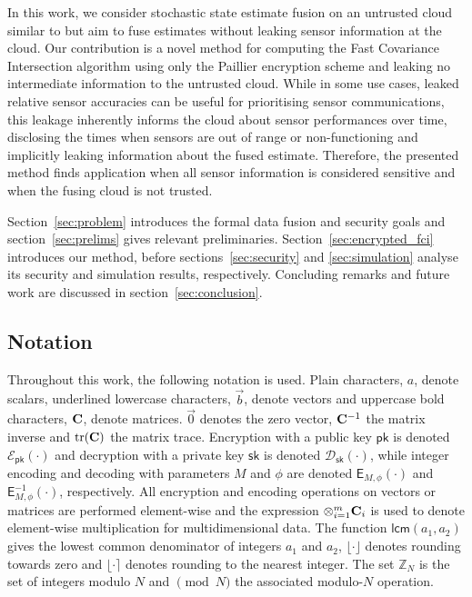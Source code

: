\documentclass[letterpaper, 10 pt, conference]{ieeeconf}
\begin{document}
In this work, we consider stochastic state estimate fusion on an untrusted cloud similar to \cite{risticSecureFastCovariance2021} but aim to fuse estimates without leaking sensor information at the cloud. Our contribution is a novel method for computing the Fast Covariance Intersection algorithm using only the Paillier encryption scheme and leaking no intermediate information to the untrusted cloud. While in some use cases, leaked relative sensor accuracies can be useful for prioritising sensor communications, this leakage inherently informs the cloud about sensor performances over time, disclosing the times when sensors are out of range or non-functioning and implicitly leaking information about the fused estimate. Therefore, the presented method finds application when all sensor information is considered sensitive and when the fusing cloud is not trusted.

Section~\ref{sec:problem} introduces the formal data fusion and security goals and section~\ref{sec:prelims} gives relevant preliminaries. Section~\ref{sec:encrypted_fci} introduces our method, before sections~\ref{sec:security} and \ref{sec:simulation} analyse its security and simulation results, respectively. Concluding remarks and future work are discussed in section~\ref{sec:conclusion}.

\subsection{Notation}
Throughout this work, the following notation is used. Plain characters, $a$, denote scalars, underlined lowercase characters, $\vec{b}$, denote vectors and uppercase bold characters, ${{\mathbf{C}}}$, denote matrices. $\vec{0}$ denotes the zero vector, ${{\mathbf{C}}}^{-1}$ the matrix inverse and $\operatorname{tr}({{\mathbf{C}}})$ the matrix trace. Encryption with a public key $\mathsf{pk}$ is denoted $\mathcal{E}_{\mathsf{pk}}(\cdot)$ and decryption with a private key $\mathsf{sk}$ is denoted $\mathcal{D}_{\mathsf{sk}}(\cdot)$, while integer encoding and decoding with parameters $M$ and $\phi$ are denoted $\mathsf{E}_{M,\phi}(\cdot)$ and $\mathsf{E}^{-1}_{M,\phi}(\cdot)$, respectively. All encryption and encoding operations on vectors or matrices are performed element-wise and the expression $\otimes_{i=1}^{m}{{\mathbf{C}}}_i$ is used to denote element-wise multiplication for multidimensional data. The function $\mathsf{lcm}(a_1,a_2)$ gives the lowest common denominator of integers $a_1$ and $a_2$, $\lfloor\cdot\rfloor$ denotes rounding towards zero and $\lfloor\cdot\rceil$ denotes rounding to the nearest integer. The set $\mathbb{Z}_N$ is the set of integers modulo $N$ and $\pmod{N}$ the associated modulo-$N$ operation.
\end{document}
